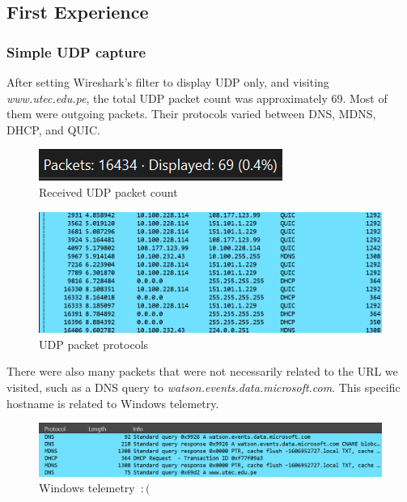 \subsection{First Experience}

\subsubsection{Simple UDP capture}

After setting Wireshark's filter to display UDP only, and visiting
\textit{www.utec.edu.pe}, the total UDP packet count was approximately 69. Most
of them were outgoing packets. Their protocols varied between DNS, MDNS, DHCP,
and QUIC.\@

\begin{figure}[htbp]
    \centering
    \includegraphics[width=1\linewidth]{img/1.png}
    \caption{Received UDP packet count}\label{fig:1}
\end{figure}

\begin{figure}[htbp]
    \centering
    \includegraphics[width=1\linewidth]{img/2.png}
    \caption{UDP packet protocols}\label{fig:2}
\end{figure}

There were also many packets that were not necessarily related to the URL we
visited, such as a DNS query to \textit{watson.events.data.microsoft.com}. This
specific hostname is related to Windows telemetry.

\begin{figure}[htbp]
    \centering
    \includegraphics[width=1\linewidth]{img/3.png}
    \caption{Windows telemetry~\ensuremath{:(}}\label{fig:3}
\end{figure}

